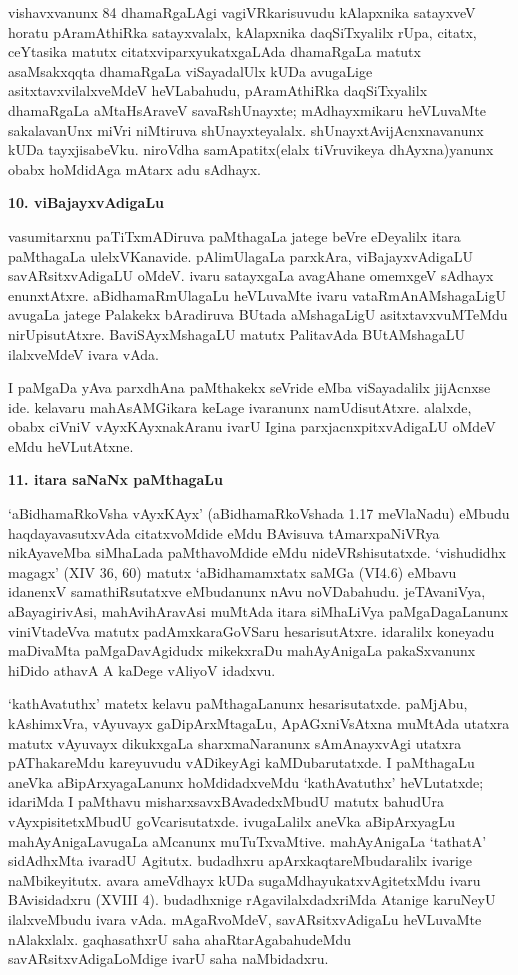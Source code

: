 vishavxvanunx 84 dhamaRgaLAgi vagiVRkarisuvudu kAlapxnika satayxveV horatu pAra\-mAthiRka satayxvalalx, kAlapxnika daqSiTxyalilx rUpa, citatx, ceYtasika matutx citatxviparxyukatxgaLAda dhamaRgaLa matutx asaMsakxqqta dhamaRgaLa viSayadalUlx kUDa avugaLige asitxtavxvilalxveMdeV heVLabahudu, pAramAthiRka daqSiTxyalilx dhamaRgaLa aMtaHsAraveV savaRshUnayxte; mAdhayxmikaru heVLuvaMte sakalavanUnx miVri niMtiruva shUnayxteyalalx. shUnayxtA\-vijAcnxnavanunx kUDa tayxjisabeVku. niroVdha samApatitx(elalx tiVruvikeya dhAyxna)yanunx obabx hoMdidAga mAtarx adu sAdhayx.

\begin{center}
{\textbf{\Large 10. viBajayxvAdigaLu}}
\end{center}

vasumitarxnu paTiTxmADiruva paMthagaLa jatege beVre eDeyalilx itara paMthagaLa ulelxVKanavide. pAlimUlagaLa parxkAra, viBajayxvAdigaLU savARsitxvAdigaLU oMdeV. ivaru satayxgaLa avagAhane omemxgeV sAdhayx enunxtAtxre. aBidhamaRmUlagaLu heVLuvaMte ivaru vataRmAnAMshagaLigU avugaLa jatege Palakekx bAradiruva BUtada aMshagaLigU asitxtavxvuMTeMdu nirUpisutAtxre. BaviSAyxMshagaLU matutx PalitavAda BUtAMshagaLU ilalxveMdeV ivara vAda.

I paMgaDa yAva parxdhAna paMthakekx seVride eMba viSayadalilx jijAcnxse ide. kelavaru mahAsAMGikara keLage ivaranunx namUdisutAtxre. alalxde, obabx ciVniV vAyxKAyxnakAranu ivarU Igina parxjacnxpitxvAdigaLU oMdeV eMdu heVLutAtxne.

\begin{center}
{\textbf{\Large 11. itara saNaNx paMthagaLu}}
\end{center}
 
`aBidhamaRkoVsha vAyxKAyx' (aBidhamaRkoVshada 1.17 meVlaNadu) eMbudu haqdayavasutxvAda citatxvoMdide eMdu BAvisuva tAmarxpaNiVRya nikAyaveMba siMhaLada paMthavoMdide eMdu nideVRshisutatxde. `vishudidhx magagx' {\rm (XIV 36, 60)} matutx `aBidhamamxtatx saMGa {\rm (VI4.6)} eMbavu idanenxV samathiRsutatxve eMbudanunx nAvu noVDabahudu. jeTAvaniVya, aBayagirivAsi, mahAvihAravAsi muMtAda itara siMhaLiVya paMgaDagaLanunx viniVtadeVva matutx padAmxkaraGoVSaru hesarisutAtxre. idaralilx koneyadu maDivaMta paMgaDavAgidudx mikekxraDu mahAyAnigaLa pakaSxvanunx hiDido athavA A kaDege vAliyoV idadxvu.

`kathAvatuthx' matetx kelavu paMthagaLanunx hesarisutatxde. paMjAbu, kAshimxVra, vAyuvayx gaDipArxMtagaLu, ApAGxniVsAtxna muMtAda utatxra matutx vAyuvayx dikukxgaLa sharxmaNaranunx sAmAnayxvAgi utatxra pAThakareMdu kareyuvudu vADikeyAgi kaMDubarutatxde. I paMthagaLu aneVka aBipArxyagaLanunx hoMdidadxveMdu `kathAvatuthx' heVLutatxde; idariMda I paMthavu misharxsavxBAvadedxMbudU matutx bahudUra vAyxpisitetxMbudU goVcarisutatxde. ivugaLalilx aneVka aBipArxyagLu mahAyAnigaLavugaLa aMcanunx muTuTxvaMtive. mahAyAnigaLa `tathatA' sidAdhxMta ivaradU Agitutx. budadhxru apArxkaqtareMbudaralilx ivarige naMbikeyitutx. avara ameVdhayx kUDa sugaMdhayukatxvAgitetxMdu ivaru BAvisidadxru {\rm (XVIII 4)}. budadhxnige rAgavilalxdadxriMda Atanige karuNeyU ilalxveMbudu ivara vAda. mAgaRvoMdeV, savARsitxvAdigaLu heVLuvaMte nAlakxlalx. gaqhasathxrU saha ahaRtarAgabahudeMdu savARsitxvAdigaLoMdige ivarU saha naMbidadxru.

